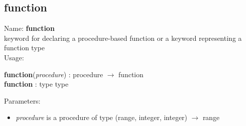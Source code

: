 \subsection{function}
\label{labfunction}
\noindent Name: \textbf{function}\\
keyword for declaring a procedure-based function or a keyword representing a \textsf{function} type \\
\noindent Usage: 
\begin{center}
\textbf{function}(\emph{procedure})  : \textsf{procedure} $\rightarrow$ \textsf{function}\\
\textbf{function} : \textsf{type type}\\
\end{center}
Parameters: 
\begin{itemize}
\item \emph{procedure} is a procedure of type (\textsf{range}, \textsf{integer}, \textsf{integer}) $\rightarrow$ \textsf{range}
\end{itemize}
